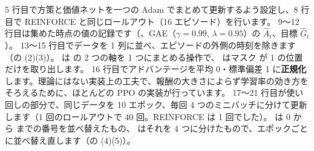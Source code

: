 
5 行目で方策と価値ネットを一つの Adam でまとめて更新するよう設定し、8 行目で REINFORCE と同じロールアウト（16 エピソード）を行います。
9〜12 行目は集めた時点の値の記録です（、GAE（$\gamma=0.99$, $\lambda=0.95$）の $\hat{A}_t$、目標 $\hat{G}_t$）。
13〜15 行目でデータを 1 列に並べ、エピソードの外側の時刻を除きます（の (2)(3)）。
 は  の 2 つの軸を 1 つにまとめる操作で、\code{[keep]} はマスク  が 1 の位置だけを取り出します。
16 行目でアドバンテージを平均 0・標準偏差 1 に\textbf{正規化}します。理論にはない実装上の工夫で、報酬の大きさによらず学習率の効き方をそろえるために、ほとんどの PPO の実装が行っています。
17〜21 行目が使い回しの部分で、同じデータを 10 エポック、毎回 4 つのミニバッチに分けて更新します（1 回のロールアウトで 40 回。REINFORCE は 1 回でした）。
 は 0 から  までの番号を並べ替えたもの、 はそれを 4 つに分けたもので、エポックごとに並べ替え直します（の (4)(5)）。


